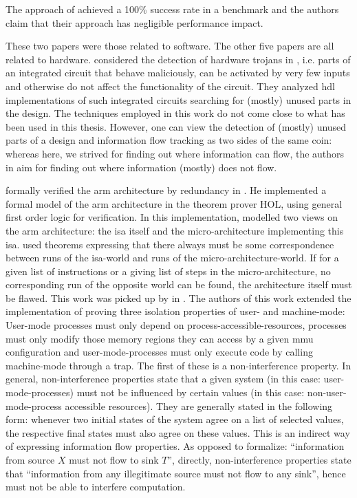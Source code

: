 The approach of \cite{SuhLZD04} achieved a 100\% success rate in a benchmark and the authors claim that their approach has negligible performance impact.

These two papers were those related to software.
The other five papers are all related to hardware.
\citeauthor{Zhang15} considered the detection of hardware trojans in  \cite{Zhang15}, i.e. parts of an integrated circuit that behave maliciously, can be activated by very few inputs and otherwise do not affect the functionality of the circuit.
They analyzed \gls{hdl} implementations of such integrated circuits searching for (mostly) unused parts in the design.
The techniques employed in this work do not come close to what has been used in this thesis.
However, one can view the detection of (mostly) unused parts of a design and information flow tracking as two sides of the same coin: whereas here, we strived for finding out where information can flow, the authors in \cite{Zhang15} aim for finding out where information (mostly) does not flow.

\citeauthor{Fox02} formally verified the \gls{arm} architecture by redundancy in  \cite{Fox02}.
He implemented a formal model of the \gls{arm} architecture in the theorem prover HOL, using general first order logic for verification.
In this implementation, \citeauthor{Fox02} modelled two views on the \gls{arm} architecture: the \gls{isa} itself and the micro-architecture implementing this \gls{isa}.
\citeauthor{Fox02} used theorems expressing that there always must be some correspondence between runs of the \gls{isa}-world and runs of the micro-architecture-world.
If for a given list of instructions or a giving list of steps in the micro-architecture, no corresponding run of the opposite world can be found, the architecture itself must be flawed.
This work was picked up by \citeauthor{KhakpourSD13} in  \cite{KhakpourSD13}.
The authors of this work extended the implementation of \citeauthor{Fox02} proving three isolation properties of user- and machine-mode:
User-mode processes must only depend on process-accessible-resources, processes must only modify those memory regions they can access by a given \gls{mmu} configuration and user-mode-processes must only execute code by calling machine-mode through a trap.
The first of these is a non-interference property.
In general, non-interference properties state that a given system (in this case: user-mode-processes) must not be influenced by certain values (in this case: non-user-mode-process accessible resources).
They are generally stated in the following form: whenever two initial states of the system agree on a list of selected values, the respective final states must also agree on these values.
This is an indirect way of expressing information flow properties.
As opposed to formalize: \enquote{information from source $ X $ must not flow to sink $ T $}, directly, non-interference properties state that \enquote{information from any illegitimate source must not flow to any sink}, hence must not be able to interfere computation.

